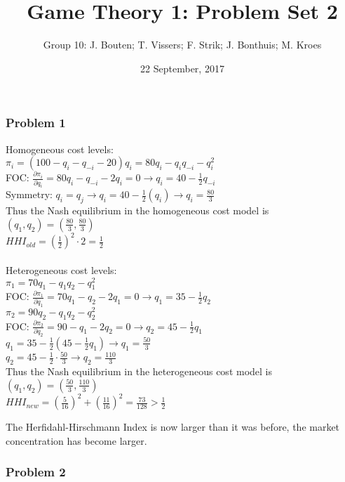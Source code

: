 \documentclass[a4paper]{article}
\author{Group 10: J. Bouten; T. Vissers; F. Strik; J. Bonthuis; M. Kroes}
\date{22 September, 2017}
\title{Game Theory 1: Problem Set 2}
\begin{document}
\maketitle

\subsubsection{Problem 1}\label{problem1}

Homogeneous cost levels:\\
$\pi_i=(100-q_i-q_{-i}-20)q_i=80q_i-q_iq_{-i}-q_i^2$\\ 
FOC: $\frac{\partial\pi_i}{\partial q_i}=80q_i-q_{-i}-2q_i=0 \rightarrow q_i=40-\frac{1}{2}q_{-i}$\\
Symmetry: $q_i=q_j \rightarrow q_i=40-\frac{1}{2}(q_i)  \rightarrow q_i=\frac{80}{3}$
\\ 
Thus the Nash equilibrium in the homogeneous cost model is $(q_1,q_2)=(\frac{80}{3},\frac{80}{3})$
\\ $HHI_{old}=\left(\frac{1}{2}\right)^2\cdot2=\frac{1}{2}$\\ \\
Heterogeneous cost levels: \\ $\pi_1=70q_1-q_1q_2-q_1^2$\\
FOC: $\frac{\partial\pi_1}{\partial q_1}=70q_1-q_2-2q_1=0 \rightarrow q_1=35-\frac{1}{2}q_2 $\\
$\pi_2=90q_2-q_1q_2-q_2^2$\\
FOC: $\frac{\partial\pi_2}{\partial q_2}=90-q_1-2q_2=0 \rightarrow q_2=45-\frac{1}{2}q_1$\\
$q_1=35-\frac{1}{2}(45-\frac{1}{2}q_1) \rightarrow q_1=\frac{50}{3}$\\
$q_2=45-\frac{1}{2}\cdot\frac{50}{3} \rightarrow q_2=\frac{110}{3}$\\
Thus the Nash equilibrium in the heterogeneous cost model is $(q_1,q_2)=(\frac{50}{3},\frac{110}{3})$\\
$HHI_{new}=\left(\frac{5}{16}\right)^2+\left(\frac{11}{16}\right)^2=\frac{73}{128}>\frac{1}{2}$

The Herfidahl-Hirschmann Index is now larger than it was before, the market concentration has become larger. 

\subsubsection{Problem 2}\label{problem2}
\end{document}
